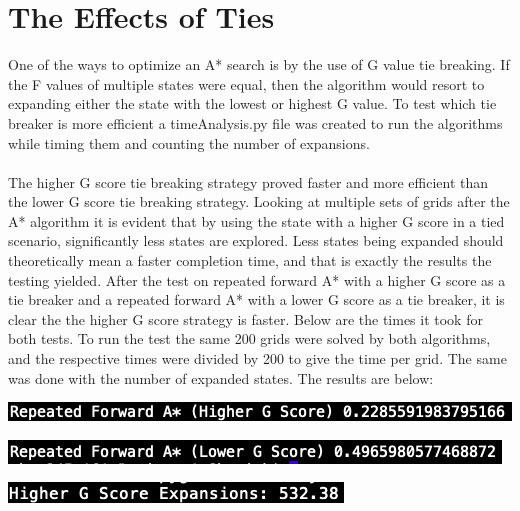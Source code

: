 \documentclass[12pt]{article}
\begin{document}
\section{The Effects of Ties}

One of the ways to optimize an A* search is by the use of G value tie breaking. If the F values of multiple states were equal, then the algorithm would resort to expanding either the state with the lowest or highest G value. To test which tie breaker is more efficient a timeAnalysis.py file was created to run the algorithms while timing them and counting the number of expansions. \\
\\
The higher G score tie breaking strategy proved faster and more efficient than the lower G score tie breaking strategy. Looking at multiple sets of grids after the A* algorithm it is evident that by using the state with a higher G score in a tied scenario, significantly less states are explored. Less states being expanded should theoretically mean a faster completion time, and that is exactly the results the testing yielded. After the test on repeated forward A* with a higher G score as a tie breaker and a repeated forward A* with a lower G score as a tie breaker, it is clear the the higher G score strategy is faster. Below are the times it took for both tests.  To run the test the same 200 grids were solved by both algorithms, and the respective times were divided by 200 to give the time per grid. The same was done with the number of expanded states. The results are below:\\


\begin{center}
\includegraphics{higherGScore.png}
\end{center}

\begin{center}
\includegraphics{lowerGScore.png}
\end{center}

\begin{center}
\includegraphics{higherGScoreExp.png}
\end{center}
\end{document}
